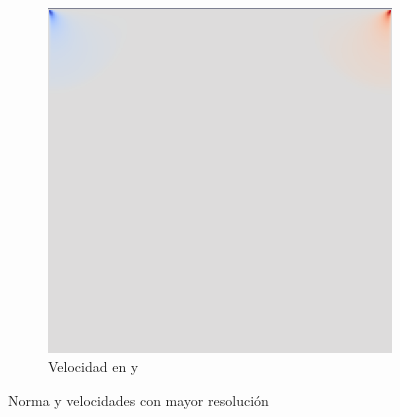 \begin{figure}[!htbp]
\begin{subfigure}{.3\textwidth}
  \centering
  \includegraphics[width=.8\linewidth]{imagenes/v.png}
  \caption{Velocidad en y}
  \label{fig:sub2}
\end{subfigure}
\caption{Norma y velocidades con mayor resolución}
\label{fig:run_2}
\end{figure}

